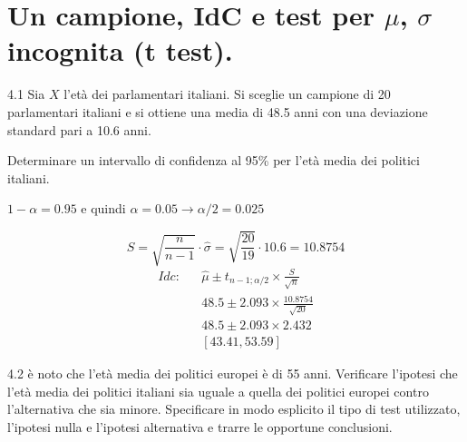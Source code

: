 \documentclass[
  11pt,
]{book}
\theoremstyle{mytheoremstyle}
\theoremstyle{mydefstyle}
\newenvironment{sol}
  {
  \begin{tcolorbox}[enhanced,breakable,arc=0.1mm,boxrule=1pt,colback=white,colframe=iblue,
  title=\bf \fontfamily{lmss}\selectfont \hspace{.5 cm} Soluzione,drop fuzzy shadow]

}{
\end{tcolorbox}
  }
\begin{document}
\section{\texorpdfstring{Un campione, IdC e test per \(\mu\), \(\sigma\) incognita (t test).}{Un campione, IdC e test per \textbackslash mu, \textbackslash sigma incognita (t test).}}\label{un-campione-idc-e-test-per-mu-sigma-incognita-t-test.}

4.1 Sia \(X\) l'età dei parlamentari italiani.
Si sceglie un campione di 20 parlamentari italiani e si ottiene una
media di 48.5 anni con una deviazione standard pari a 10.6 anni.

Determinare un intervallo di confidenza al 95\% per
l'età media dei politici italiani.

\begin{sol}
\(1-\alpha =0.95\) e quindi \(\alpha=0.05\rightarrow \alpha/2=0.025\)

\[
      S  =\sqrt{\frac {n}{n-1}}\cdot\hat\sigma =
     \sqrt{\frac { 20 }{ 19 }}\cdot 10.6 = 10.8754 
\]
\begin{eqnarray*}
  Idc: & &  \hat\mu \pm  t_{n-1;\alpha/2} \times \frac{S}{\sqrt{n}} \\
     & &  48.5 \pm  2.093 \times \frac{ 10.8754 }{\sqrt{ 20 }} \\
     & &  48.5 \pm  2.093 \times  2.432 \\
     & & [ 43.41 ,  53.59 ]
\end{eqnarray*}

\end{sol}

4.2 è noto che l'età media dei politici europei
è di 55 anni.
Verificare l'ipotesi
che l'età media dei politici italiani sia uguale a quella
dei politici europei contro l'alternativa che sia minore.
Specificare in modo esplicito il tipo di test utilizzato,
l'ipotesi nulla e l'ipotesi alternativa e trarre le opportune
conclusioni.
\end{document}
